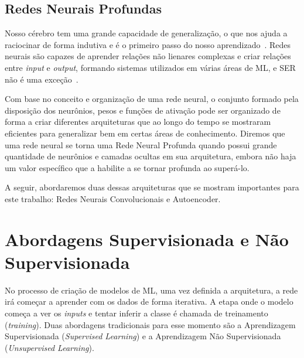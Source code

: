 \subsection{Redes Neurais Profundas}

Nosso cérebro tem uma grande capacidade de generalização, o que nos ajuda a raciocinar de forma indutiva e é o primeiro passo do nosso aprendizado~\cite{32}. Redes neurais são capazes de aprender relações não lienares complexas e criar relações entre \textit{input} e \textit{output}, formando sistemas utilizados em várias áreas de \acrshort{ML}, e \acrshort{SER} não é uma exceção~\cite{32.74}.

Com base no conceito e organização de uma rede neural, o conjunto formado pela disposição dos neurônios, pesos e funções de ativação pode ser organizado de forma a criar diferentes arquiteturas que ao longo do tempo se mostraram eficientes para generalizar bem em certas áreas de conhecimento. Diremos que uma rede neural se torna uma Rede Neural Profunda quando possui grande quantidade de neurônios e camadas ocultas em sua arquitetura, embora não haja um valor específico que a habilite a se tornar profunda ao superá-lo.




A seguir, abordaremos duas dessas arquiteturas que se mostram importantes para este trabalho: Redes Neurais Convolucionais e Autoencoder.


\section{Abordagens Supervisionada e Não Supervisionada}\label{sec:spvsup}

No processo de criação de modelos de \acrshort{ML}, uma vez definida a arquitetura, a rede irá começar a aprender com os dados de forma iterativa. A etapa onde o modelo começa a ver os \textit{inputs} e tentar inferir a classe é chamada de treinamento (\textit{training}). Duas abordagens tradicionais para esse momento são a Aprendizagem Supervisionada (\textit{Supervised Learning}) e a Aprendizagem Não Supervisionada (\textit{Unsupervised Learning}).

